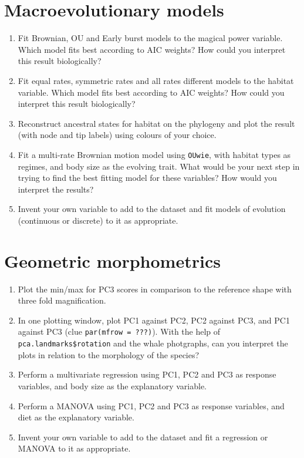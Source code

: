 \documentclass[]{book}
\providecommand{\tightlist}{%
  \setlength{\itemsep}{0pt}\setlength{\parskip}{0pt}}
\begin{document}
\section{Macroevolutionary models}\label{macroevolutionary-models}

\begin{enumerate}
\def\labelenumi{\arabic{enumi}.}
\tightlist
\item
  Fit Brownian, OU and Early burst models to the magical power variable.
  Which model fits best according to AIC weights? How could you
  interpret this result biologically?
\item
  Fit equal rates, symmetric rates and all rates different models to the
  habitat variable. Which model fits best according to AIC weights? How
  could you interpret this result biologically?
\item
  Reconstruct ancestral states for habitat on the phylogeny and plot the
  result (with node and tip labels) using colours of your choice.
\item
  Fit a multi-rate Brownian motion model using \texttt{OUwie}, with
  habitat types as regimes, and body size as the evolving trait. What
  would be your next step in trying to find the best fitting model for
  these variables? How would you interpret the results?
\item
  Invent your own variable to add to the dataset and fit models of
  evolution (continuous or discrete) to it as appropriate.
\end{enumerate}

\section{Geometric morphometrics}\label{geometric-morphometrics}

\begin{enumerate}
\def\labelenumi{\arabic{enumi}.}
\tightlist
\item
  Plot the min/max for PC3 scores in comparison to the reference shape
  with three fold magnification.
\item
  In one plotting window, plot PC1 against PC2, PC2 against PC3, and PC1
  against PC3 (clue \texttt{par(mfrow\ =\ ???)}). With the help of
  \texttt{pca.landmarks\$rotation} and the whale photgraphs, can you
  interpret the plots in relation to the morphology of the species?
\item
  Perform a multivariate regression using PC1, PC2 and PC3 as response
  variables, and body size as the explanatory variable.
\item
  Perform a MANOVA using PC1, PC2 and PC3 as response variables, and
  diet as the explanatory variable.
\item
  Invent your own variable to add to the dataset and fit a regression or
  MANOVA to it as appropriate.
\end{enumerate}
\end{document}
